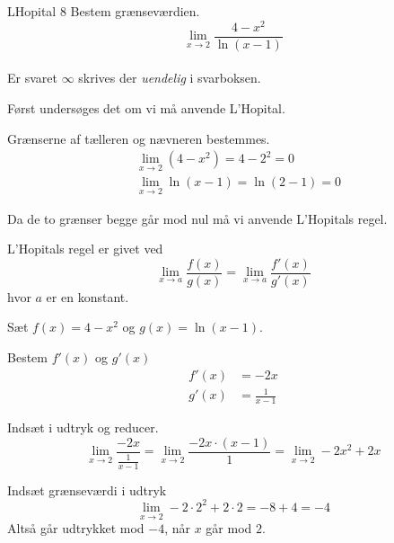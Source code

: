 \documentclass{article}
\begin{document}
\begin{exercise}{LHopital 8}
	Bestem grænseværdien.
	\[
	\lim_{x \to 2} \frac{4 - x^2}{\ln(x - 1)}
	\] 
	\\
	Er svaret $\infty$ skrives der \emph{uendelig} i svarboksen.
	
	
	\hint
	Først undersøges det om vi må anvende L'Hopital.
	
	\hint
	Grænserne af tælleren og nævneren bestemmes.
	\begin{align*}
		&\lim_{x \to 2} (4 - x^2) = 4 - 2^2 = 0 \\
		&\lim_{x \to 2} \ln(x - 1) = \ln(2 - 1) = 0
	\end{align*}
	
	\hint
	Da de to grænser begge går mod nul må vi  anvende L'Hopitals regel. 
	
	\hint
	L'Hopitals regel er givet ved
	\[
	\lim_{x \to a} \frac{f(x)}{g(x)} = \lim_{x \to a} \frac{f'(x)}{g'(x)} 
	\]
	hvor $a$  er en konstant.
	
	\hint
	Sæt $f(x) = 4 - x^2$ og $g(x) = \ln(x-1)$. 
	
	\hint
	Bestem $f'(x)$ og $g'(x)$
	\begin{align*}
		f'(x) &= -2 x \\
		g'(x) &= \frac{1}{x-1}
	\end{align*}
	
	\hint
	Indsæt i udtryk og reducer. 
	\[
	\lim_{x \to 2} \frac{-2x}{\frac{1}{x-1}} = \lim_{x \to 2} \frac{-2x \cdot (x-1)}{1} = \lim_{x \to 2} -2x^2 + 2x
	\]
	
	\hint
	Indsæt grænseværdi i udtryk
	\[
	\lim_{x \to 2} -2 \cdot 2^2 + 2 \cdot 2 = -8 + 4 = -4
	\]
	Altså går udtrykket mod $-4$, når $x$ går mod $2$. 
	
\end{exercise}
\end{document}
